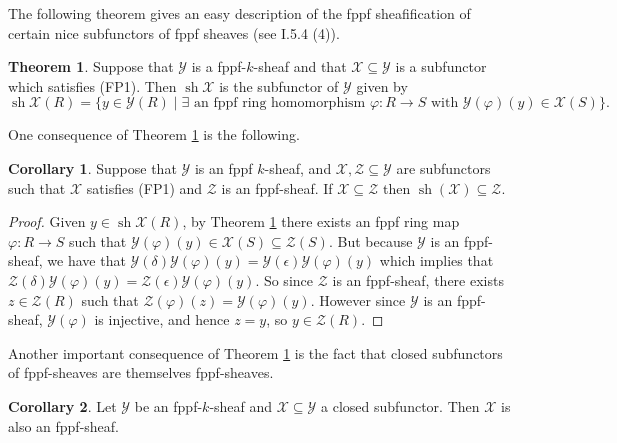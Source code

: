 \documentclass[oneside,11pt]{amsart}
\newcommand{\mX}{\ensuremath{\mathcal{X}}}
\newcommand{\mY}{\ensuremath{\mathcal{Y}}}
\newcommand{\mZ}{\ensuremath{\mathcal{Z}}}
\newcommand{\sh}{\operatorname{sh}}
\theoremstyle{definition}
\newtheorem{proof techniques}{Proof Techniques}
\newtheorem{corollary}{Corollary}
\newtheorem{theorem}{Theorem}
\begin{document}

The following theorem gives an easy description of the fppf sheafification of certain nice subfunctors of fppf sheaves (see \cite{jantzen2003} I.5.4 (4)). 
 
\begin{theorem}\label{thm: easy fppf sheafification}
Suppose that $\mY$ is a fppf-$k$-sheaf and that $\mX \subseteq \mY$ is a subfunctor which satisfies (FP1). Then $\sh \mX$ is the subfunctor of $\mY$ given by
\begin{equation*}
\sh \mX(R) = \{ y \in \mY(R) \mid \exists \text{ an fppf ring homomorphism } \varphi: R \to S \text{ with } \mY(\varphi)(y) \in \mX(S) \}.
\end{equation*}
\end{theorem}

One consequence of Theorem \ref{thm: easy fppf sheafification} is the following.

\begin{corollary}\label{cor: fppf subfunctor that contains a subfunctor contains its sheafification}
Suppose that $\mY$ is an fppf $k$-sheaf, and $\mX, \mZ \subseteq \mY$ are subfunctors such that $\mX$ satisfies (FP1) and $\mZ$ is an fppf-sheaf. If $\mX \subseteq \mZ$ then $\sh (\mX) \subseteq \mZ$.  
\end{corollary}

\begin{proof}
Given $y \in \sh\mX(R)$, by Theorem \ref{thm: easy fppf sheafification} there exists an fppf ring map $\varphi : R \to S$ such that $\mY(\varphi)(y) \in \mX(S) \subseteq \mZ(S)$. But because $\mY$ is an fppf-sheaf, we have that $\mY(\delta) \mY(\varphi)(y) = \mY(\epsilon) \mY(\varphi)(y)$ which implies that $\mZ(\delta) \mY(\varphi)(y) = \mZ(\epsilon) \mY(\varphi)(y)$. So since $\mZ$ is an fppf-sheaf, there exists $z \in \mZ(R)$ such that $\mZ(\varphi)(z) = \mY(\varphi)(y)$. However since $\mY$ is an fppf-sheaf, $\mY(\varphi)$ is injective, and hence $z = y$, so $y \in \mZ(R)$. 
\end{proof}

Another important consequence of Theorem \ref{thm: easy fppf sheafification} is the fact that closed subfunctors of fppf-sheaves are themselves fppf-sheaves. 

\begin{corollary}\label{cor: closed subfunctors of sheaves are sheaves}
Let $\mY$ be an fppf-$k$-sheaf and $\mX \subseteq \mY$ a closed subfunctor. Then $\mX$ is also an fppf-sheaf. 
\end{corollary}
\end{document}

